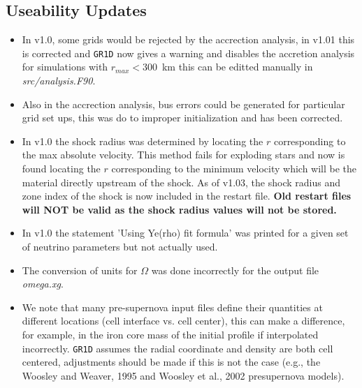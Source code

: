 \documentclass[10pt,nofootinbib]{article}
\newcommand{\code}[1]{\texttt{#1}}
\begin{document}
\subsection{Useability Updates}
\begin{itemize}
\item In v1.0, some grids would be rejected by the accrection analysis,
in v1.01 this is corrected and \code{GR1D} now gives a warning and
disables the accretion analysis for simulations with $r_{max} <
300$~km this can be editted manually in {\it src/analysis.F90}.
\item Also in the accrection analysis, bus errors could be generated
  for particular grid set ups, this was do to improper initialization
  and has been corrected.
\item In v1.0 the shock radius was determined by locating the $r$
  corresponding to the max absolute velocity.  This method fails for
  exploding stars and now is found locating the $r$ corresponding to
  the minimum velocity which will be the material directly upstream of
  the shock.  As of v1.03, the shock radius and zone index of the
  shock is now included in the restart file.  {\bf{Old restart files
      will NOT be valid as the shock radius values will not be stored.}}
\item In v1.0 the statement 'Using Ye(rho) fit formula' was printed
  for a given set of neutrino parameters but not actually used.
\item The conversion of units for $\Omega$ was done incorrectly for
  the output file {\emph{omega.xg}}.
\item We note that many pre-supernova input files define their
  quantities at different locations (cell interface vs. cell center),
  this can make a difference, for example, in the iron core mass of
  the initial profile if interpolated incorrectly.  \code{GR1D}
  assumes the radial coordinate and density are both cell centered,
  adjustments should be made if this is not the case (e.g., the
  Woosley and Weaver, 1995 and Woosley et al., 2002 presupernova models).
\end{itemize}
\end{document}

